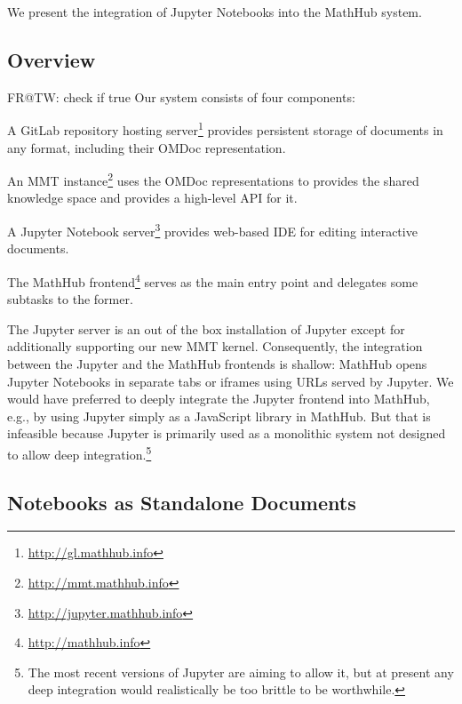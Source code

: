 We present the integration of Jupyter Notebooks into the MathHub system.


\subsection{Overview}

\begin{newpart}{FR@TW: check if true}
Our system consists of four components:
\begin{compactitem}
\item A GitLab repository hosting server\footnote{\url{http://gl.mathhub.info}} provides persistent storage of documents in any format, including their OMDoc representation.
\item An MMT instance\footnote{\url{http://mmt.mathhub.info}} uses the OMDoc representations to provides the shared knowledge space and provides a high-level API for it.
\item A Jupyter Notebook server\footnote{\url{http://jupyter.mathhub.info}} provides web-based IDE for editing interactive documents.
\item The MathHub frontend\footnote{\url{http://mathhub.info}} serves as the main entry point and delegates some subtasks to the former.
\end{compactitem}

The Jupyter server is an out of the box installation of Jupyter except for additionally supporting our new MMT kernel.
Consequently, the integration between the Jupyter and the MathHub frontends is shallow: MathHub opens Jupyter Notebooks in separate tabs or iframes using URLs served by Jupyter.
We would have preferred to deeply integrate the Jupyter frontend into MathHub, e.g., by using Jupyter simply as a JavaScript library in MathHub.
But that is infeasible because Jupyter is primarily used as a monolithic system not designed to allow deep integration.\footnote{The most recent versions of Jupyter are aiming to allow it, but at present any deep integration would realistically be too brittle to be worthwhile.}
\end{newpart}

\subsection{Notebooks as Standalone Documents}

